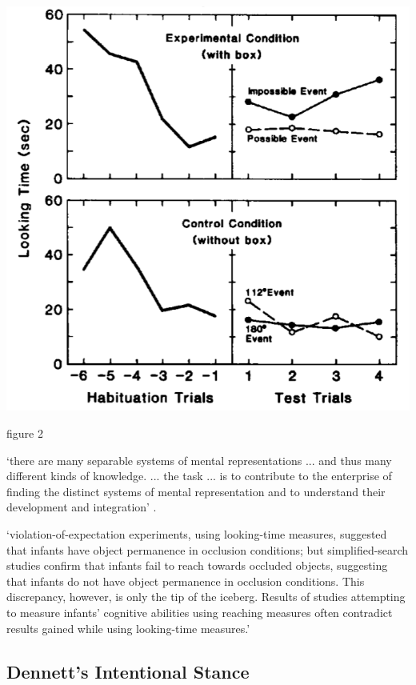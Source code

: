 \documentclass[12pt]{extarticle}
\begin{document}
\begin{multicols}{3}
\begin{center}
\includegraphics[scale=0.3]{../www.slides/src/files/img/baillargeon_1987_fig2.neg.png}
\end{center}
\begin{center} \citealp{baillargeon:1987_object} figure 2 \end{center}
 
‘there are many separable systems of mental representations ... and thus many different kinds of knowledge. ... the task ... is to contribute to the enterprise of finding the distinct systems of mental representation and to understand their development and integration’
\citep[p.\ 1522]{Hood:2000bf}.
 
‘violation-of-expectation experiments, using looking-time measures, suggested that infants have object permanence in occlusion conditions; but simplified-search studies confirm that infants fail to reach towards occluded objects, suggesting that infants do not have object permanence in occlusion conditions. This discrepancy, however, is only the tip of the iceberg. Results of studies attempting to measure infants’ cognitive abilities using reaching measures often contradict results gained while using looking-time measures.’ \citep[p.\ 994]{charles:2009_object}
 
\subsection{Dennett’s Intentional Stance}
 

\end{multicols}
\end{document}
